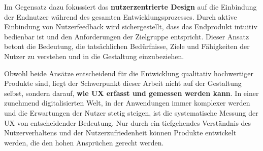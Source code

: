 \documentclass[12pt,oneside]{article}
\begin{document}
Im Gegensatz dazu fokussiert das \textbf{nutzerzentrierte Design} auf die Einbindung der Endnutzer während des gesamten Entwicklungsprozesses. Durch aktive Einbindung von Nutzerfeedback wird sichergestellt, dass das Endprodukt intuitiv bedienbar ist und den Anforderungen der Zielgruppe entspricht. Dieser Ansatz betont die Bedeutung, die tatsächlichen Bedürfnisse, Ziele und Fähigkeiten der Nutzer zu verstehen und in die Gestaltung einzubeziehen.

Obwohl beide Ansätze entscheidend für die Entwicklung qualitativ hochwertiger Produkte sind, liegt der Schwerpunkt dieser Arbeit nicht auf der Gestaltung selbst, sondern darauf, \textbf{wie UX erfasst und gemessen werden kann}. In einer zunehmend digitalisierten Welt, in der Anwendungen immer komplexer werden und die Erwartungen der Nutzer stetig steigen, ist die systematische Messung der UX von entscheidender Bedeutung. Nur durch ein tiefgehendes Verständnis des Nutzerverhaltens und der Nutzerzufriedenheit können Produkte entwickelt werden, die den hohen Ansprüchen gerecht werden.
\end{document}
